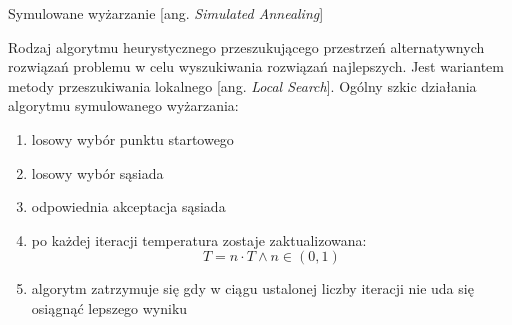 \begin{frame}{Symulowane wyżarzanie [ang. \textit{Simulated Annealing}]}

	\begin{block}{}
	Rodzaj algorytmu heurystycznego przeszukującego przestrzeń alternatywnych rozwiązań problemu w celu wyszukiwania rozwiązań najlepszych. Jest wariantem metody przeszukiwania lokalnego [ang. \textit{Local Search}].
	Ogólny szkic działania algorytmu symulowanego wyżarzania:
	\end{block}
	\begin{enumerate}
		\item losowy wybór punktu startowego
		\item losowy wybór sąsiada
		\item odpowiednia akceptacja sąsiada
		\item po każdej iteracji temperatura zostaje zaktualizowana:
			$$ T = n\cdot T \wedge n \in (0,1)$$
		\item algorytm zatrzymuje się gdy w ciągu ustalonej liczby iteracji nie uda się osiągnąć lepszego wyniku
	\end{enumerate}

\end{frame}

%
%

%
%

%	
%

%
%
